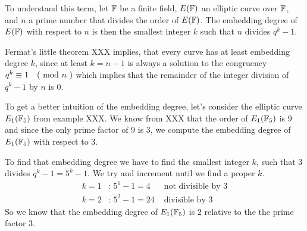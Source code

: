 To understand this term, let $\mathbb{F}$ be a finite field, $E(\mathbb{F})$ an elliptic curve over $\mathbb{F}$, and $n$ a prime number that divides the order of $E(\mathbb{F})$. The embedding degree of $E(\mathbb{F})$ with respect to $n$ is then the smallest integer $k$ such that $n$ divides $q^k-1$. 

Fermat's little theorem XXX implies, that every curve has at least  embedding degree $k$, since at least $k=n-1$ is always a solution to the congruency 
$q^k \equiv 1 \quad \text{( mod } n \text{ )}$ which implies that the remainder of the integer division of $q^k-1$ by $n$ is $0$.
\begin{example} To get a better intuition of the embedding degree, let's consider the elliptic curve $E_1(\mathbb{F}_5)$ from example XXX. We know from XXX that the order of $E_1(\mathbb{F}_5)$ is $9$ and since the only prime factor of $9$ is $3$, we compute the embedding degree of $E_1(\mathbb{F}_5)$ with respect to $3$. 

To find that embedding degree we have to find the smallest integer $k$, such that $3$ divides $q^k-1= 5^k-1$. We try and increment until we find a proper $k$. 
\begin{align*}
k=1 &\text{: } 5^1-1 = 4 & \text{ not divisible by } 3\\ 
k=2 &\text{: } 5^2-1 = 24 & \text{ divisible by } 3
\end{align*} 
So we know that the embedding degree of $E_1(\mathbb{F}_5)$ is $2$ relative to the the prime factor $3$.
\end{example}
